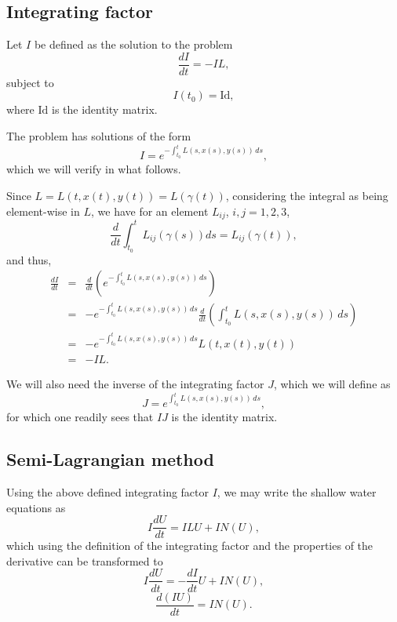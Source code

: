 \documentclass[10pt,a4paper]{article}
\begin{document}
\subsection{Integrating factor}

Let $I$ be defined as the solution to the problem 
\begin{equation}
\frac{dI}{dt}=-IL,
 \end{equation}
 subject to
\begin{equation}
I(t_0)=\text{Id},
 \end{equation}
 where $\text{Id}$ is the identity matrix.
 
 
The problem has solutions of the form
\begin{equation}
I=e^{-\int_{t_0}^t L(s, x(s), y(s))\, ds},
\end{equation} 
which we will verify in what follows.



Since $L=L(t,x(t), y(t))=L(\gamma(t))$, considering the integral as being element-wise in $L$, we have for an element $L_{ij}$, $i,j=1,2,3$,
\begin{equation}
\frac{d }{dt} \int_{t_0}^{t} L_{ij}(\gamma(s))ds =
L_{ij}(\gamma(t)),
\end{equation}
and thus,  
\begin{eqnarray}
\frac{dI}{dt}&=&\frac{d}{dt} \left(e^{-\int_{t_0}^t L(s, x(s), y(s))\, ds} \right) \\
& =& -e^{-\int_{t_0}^t L(s, x(s), y(s))\, ds} \frac{d}{dt} \left(\int_{t_0}^t L(s, x(s), y(s))\, ds \right) \\
&=& -e^{-\int_{t_0}^t L(s, x(s), y(s))\, ds} L(t, x(t), y(t))\\
&=&-IL.
\end{eqnarray}

We will also need the inverse of the integrating factor $J$, which we will define as
\begin{equation}
J=e^{\int_{t_0}^t L(s, x(s), y(s))\, ds},
\end{equation} 
for which one readily sees that $IJ$ is the identity matrix.

\subsection{Semi-Lagrangian method}
Using the above defined integrating factor $I$, we may write the shallow water equations as
\begin{equation}
I\frac{dU}{dt}=ILU+IN(U), 
\end{equation}
which using the definition of the integrating factor and the properties of the derivative can be transformed to 
\begin{equation}
I\frac{dU}{dt}=-\frac{dI}{dt}U+IN(U), 
\end{equation}
\begin{equation}
\frac{d(IU)}{dt}=I N(U).
\end{equation}
\end{document}
